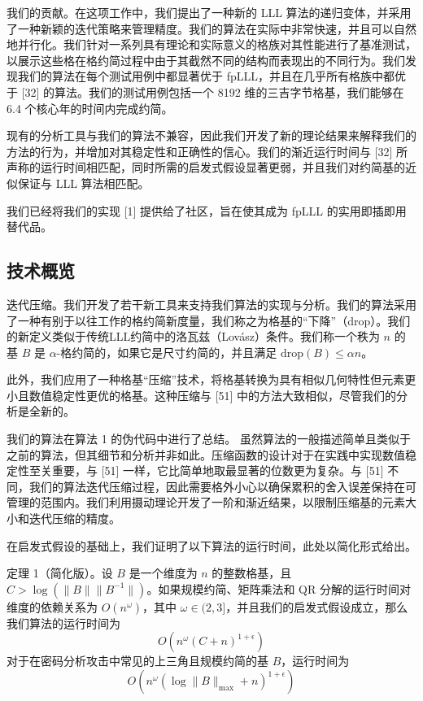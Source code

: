 \documentclass[UTF8]{ctexart}
\begin{document}
我们的贡献。在这项工作中，我们提出了一种新的 LLL 算法的递归变体，并采用了一种新颖的迭代策略来管理精度。我们的算法在实际中非常快速，并且可以自然地并行化。我们针对一系列具有理论和实际意义的格族对其性能进行了基准测试，以展示这些格在格约简过程中由于其截然不同的结构而表现出的不同行为。我们发现我们的算法在每个测试用例中都显著优于 fpLLL，并且在几乎所有格族中都优于 [32] 的算法。我们的测试用例包括一个 8192 维的三吉字节格基，我们能够在 6.4 个核心年的时间内完成约简。

现有的分析工具与我们的算法不兼容，因此我们开发了新的理论结果来解释我们的方法的行为，并增加对其稳定性和正确性的信心。我们的渐近运行时间与 [32] 所声称的运行时间相匹配，同时所需的启发式假设显著更弱，并且我们对约简基的近似保证与 LLL 算法相匹配。

我们已经将我们的实现 [1] 提供给了社区，旨在使其成为 fpLLL 的实用即插即用替代品。

    \subsection{技术概览}

    迭代压缩。我们开发了若干新工具来支持我们算法的实现与分析。我们的算法采用了一种有别于以往工作的格约简新度量，我们称之为格基的“下降”（drop）。我们的新定义类似于传统LLL约简中的洛瓦兹（Lovász）条件。我们称一个秩为 \(n\) 的基 \(B\) 是 \(\alpha\)-格约简的，如果它是尺寸约简的，并且满足 \(\text{drop}(B) \leq \alpha n\)。

    此外，我们应用了一种格基“压缩”技术，将格基转换为具有相似几何特性但元素更小且数值稳定性更优的格基。这种压缩与 [51] 中的方法大致相似，尽管我们的分析是全新的。

    我们的算法在算法 1 的伪代码中进行了总结。
    虽然算法的一般描述简单且类似于之前的算法，但其细节和分析并非如此。压缩函数的设计对于在实践中实现数值稳定性至关重要，与 [51] 一样，它比简单地取最显著的位数更为复杂。与 [51] 不同，我们的算法迭代压缩过程，因此需要格外小心以确保累积的舍入误差保持在可管理的范围内。我们利用摄动理论开发了一阶和渐近结果，以限制压缩基的元素大小和迭代压缩的精度。

    在启发式假设的基础上，我们证明了以下算法的运行时间，此处以简化形式给出。
    
        定理 1（简化版）。设 \( B \) 是一个维度为 \( n \) 的整数格基，且 \( C > \log(\|B\|\|B^{-1}\|) \)。如果规模约简、矩阵乘法和 QR 分解的运行时间对维度的依赖关系为 \( O(n^\omega) \)，其中 \( \omega \in (2, 3] \)，并且我们的启发式假设成立，那么我们算法的运行时间为
    \[ O(n^\omega (C + n)^{1 + \epsilon}) \]
    对于在密码分析攻击中常见的上三角且规模约简的基 \( B \)，运行时间为
    \[ O(n^\omega (\log \|B\|_{\max} + n)^{1 + \epsilon}) \]
\end{document}
